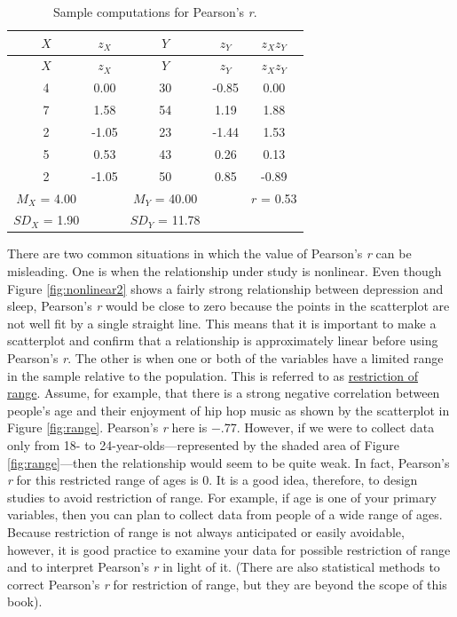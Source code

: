 \documentclass[
]{krantz}
\begin{document}
\begin{longtable}[]{@{}ccccc@{}}
\caption{\label{tab:pearsonmath} Sample computations for Pearson's \emph{r}.}\tabularnewline
\toprule()
\(X\) & \(z_X\) & \(Y\) & \(z_Y\) & \(z_Xz_Y\) \\
\midrule()
\endfirsthead
\toprule()
\(X\) & \(z_X\) & \(Y\) & \(z_Y\) & \(z_Xz_Y\) \\
\midrule()
\endhead
4 & 0.00 & 30 & -0.85 & 0.00 \\
7 & 1.58 & 54 & 1.19 & 1.88 \\
2 & -1.05 & 23 & -1.44 & 1.53 \\
5 & 0.53 & 43 & 0.26 & 0.13 \\
2 & -1.05 & 50 & 0.85 & -0.89 \\
\(M_X\) = 4.00 & & \(M_Y\) = 40.00 & & \(r\) = 0.53 \\
\(SD_X\) = 1.90 & & \(SD_Y\) = 11.78 & & \\
\bottomrule()
\end{longtable}

There are two common situations in which the value of Pearson's \emph{r} can be misleading. One is when the relationship under study is nonlinear. Even though Figure \ref{fig:nonlinear2} shows a fairly strong relationship between depression and sleep, Pearson's \emph{r} would be close to zero because the points in the scatterplot are not well fit by a single straight line. This means that it is important to make a scatterplot and confirm that a relationship is approximately linear before using Pearson's \emph{r}. The other is when one or both of the variables have a limited range in the sample relative to the population. This is referred to as \protect\hyperlink{restriction-of-range}{restriction of range}. Assume, for example, that there is a strong negative correlation between people's age and their enjoyment of hip hop music as shown by the scatterplot in Figure \ref{fig:range}. Pearson's \emph{r} here is −.77. However, if we were to collect data only from 18- to 24-year-olds---represented by the shaded area of Figure \ref{fig:range}---then the relationship would seem to be quite weak. In fact, Pearson's \emph{r} for this restricted range of ages is 0. It is a good idea, therefore, to design studies to avoid restriction of range. For example, if age is one of your primary variables, then you can plan to collect data from people of a wide range of ages. Because restriction of range is not always anticipated or easily avoidable, however, it is good practice to examine your data for possible restriction of range and to interpret Pearson's \emph{r} in light of it. (There are also statistical methods to correct Pearson's \emph{r} for restriction of range, but they are beyond the scope of this book).
\end{document}
